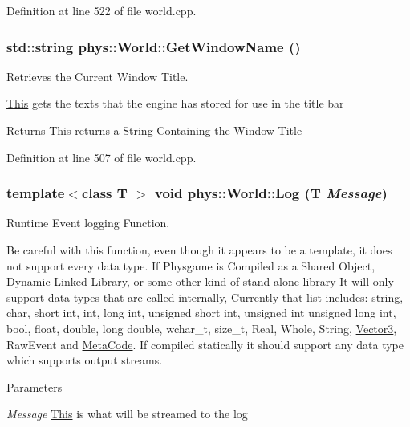 Definition at line 522 of file world.cpp.

\hypertarget{classphys_1_1World_a1f0139bbc9561bcf18844be25e4adc73}{
\subsubsection[{GetWindowName}]{\setlength{\rightskip}{0pt plus 5cm}std::string phys::World::GetWindowName ()}}
\label{da/ddf/classphys_1_1World_a1f0139bbc9561bcf18844be25e4adc73}


Retrieves the Current Window Title. 

\hyperlink{structThis}{This} gets the texts that the engine has stored for use in the title bar \begin{DoxyReturn}{Returns}
\hyperlink{structThis}{This} returns a String Containing the Window Title 
\end{DoxyReturn}


Definition at line 507 of file world.cpp.

\hypertarget{classphys_1_1World_a05267a20e8d5518771d0848190b33d60}{
\subsubsection[{Log}]{\setlength{\rightskip}{0pt plus 5cm}template$<$class T $>$ void phys::World::Log (T {\em Message})}}
\label{da/ddf/classphys_1_1World_a05267a20e8d5518771d0848190b33d60}


Runtime Event logging Function. 

Be careful with this function, even though it appears to be a template, it does not support every data type. If Physgame is Compiled as a Shared Object, Dynamic Linked Library, or some other kind of stand alone library It will only support data types that are called internally, Currently that list includes: string, char, short int, int, long int, unsigned short int, unsigned int unsigned long int, bool, float, double, long double, wchar\_\-t, size\_\-t, Real, Whole, String, \hyperlink{classphys_1_1Vector3}{Vector3}, RawEvent and \hyperlink{classphys_1_1MetaCode}{MetaCode}. If compiled statically it should support any data type which supports output streams. 
\begin{DoxyParams}{Parameters}
\item[{\em Message}]\hyperlink{structThis}{This} is what will be streamed to the log \end{DoxyParams}


